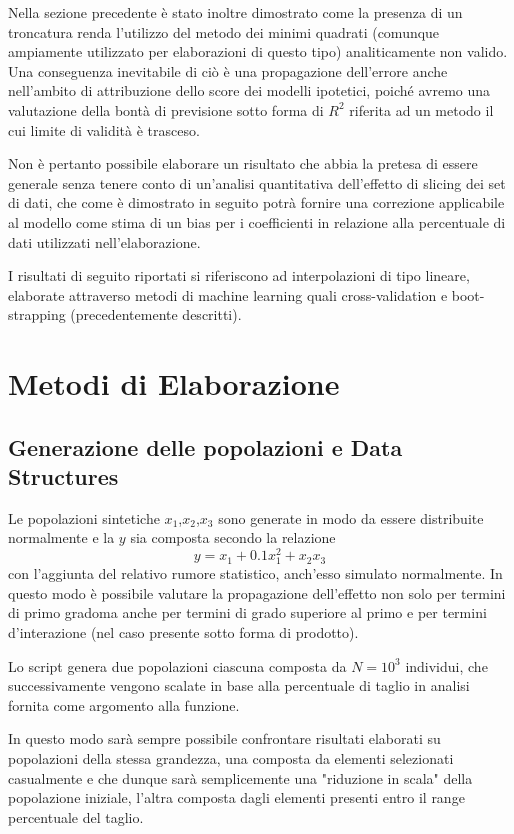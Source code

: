 \documentclass[a4paper]{report}
\begin{document}
Nella sezione precedente è stato inoltre dimostrato come la presenza di un troncatura renda l'utilizzo del metodo dei minimi quadrati (comunque ampiamente utilizzato per elaborazioni di questo tipo) analiticamente non valido. 
Una conseguenza inevitabile di ciò è una propagazione dell'errore anche nell'ambito di attribuzione dello score dei modelli ipotetici, poiché avremo una valutazione della bontà di previsione sotto forma di $R^2$ riferita ad un metodo il cui limite di validità è trasceso.

Non è pertanto possibile elaborare un risultato che abbia la pretesa di essere generale senza tenere conto di un'analisi quantitativa dell'effetto di slicing dei set di dati, che come è dimostrato in seguito potrà fornire una correzione applicabile al modello come stima di un bias per i coefficienti in relazione alla percentuale di dati utilizzati nell'elaborazione.

I risultati di seguito riportati si riferiscono ad interpolazioni di tipo lineare, elaborate attraverso metodi di machine learning quali cross-validation e boot-strapping (precedentemente descritti).

\section{Metodi di Elaborazione}
\subsection {Generazione delle popolazioni e Data Structures}
Le popolazioni sintetiche $x_1$,$x_2$,$x_3$ sono generate in modo da essere distribuite normalmente e la $y$ sia composta secondo la relazione \[y=x_1+0.1x_1^2+x_2x_3\]con l'aggiunta del relativo rumore statistico, anch'esso simulato normalmente.
In questo modo è possibile valutare la propagazione dell'effetto non solo per termini di primo gradoma anche per  termini di grado superiore al primo e per termini d'interazione (nel caso presente sotto forma di prodotto).

Lo script genera due popolazioni ciascuna composta da $N=10^3$ individui, che successivamente vengono scalate in base alla percentuale di taglio in analisi fornita come argomento alla funzione.

In questo modo sarà sempre possibile confrontare risultati elaborati su popolazioni della stessa grandezza, una composta da elementi selezionati casualmente e che dunque sarà semplicemente una "riduzione in scala" della popolazione iniziale, l'altra composta dagli elementi presenti entro il range percentuale del taglio.
\end{document}
